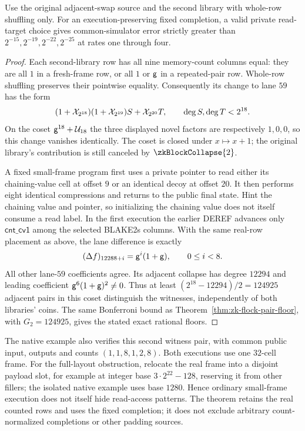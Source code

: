 \begin{theorem}\label{thm:zk-flock-shared-count-floor}
Use the original adjacent-swap source and the second library with whole-row shuffling only. For an execution-preserving fixed completion, a valid private read-target choice gives common-simulator error strictly greater than $2^{-15},2^{-19},2^{-22},2^{-25}$ at rates one through four.
\end{theorem}
\begin{proof}
Each second-library row has all nine memory-count columns equal: they are all $1$ in a fresh-frame row, or all $1$ or $\mathsf{g}$ in a repeated-pair row. Whole-row shuffling preserves their pointwise equality. Consequently its change to lane $59$ has the form
\[
 (1+\mathcal{X}_{2^{18}})(1+\mathcal{X}_{2^{19}})S
   +\mathcal{X}_{2^{20}}T,
 \qquad \deg S,\deg T<2^{18}.
\]
On the coset $\mathsf{g}^{18}+\mathcal{U}_{18}$ the three displayed novel factors are respectively $1,0,0$, so this change vanishes identically. The coset is closed under $x\mapsto x+1$; the original library's contribution is still canceled by $\zkBlockCollapse{2}$.

A fixed small-frame program first uses a private pointer to read either its chaining-value cell at offset $9$ or an identical decoy at offset $20$. It then performs eight identical compressions and returns to the public final state. Hint the chaining value and pointer, so initializing the chaining value does not itself consume a read label. In the first execution the earlier DEREF advances only $\mathsf{cnt\_cv1}$ among the selected BLAKE2s columns. With the same real-row placement as above, the lane difference is exactly
\[
 (\Delta f)_{12288+i}=\mathsf{g}^i(1+\mathsf{g}),\qquad 0\le i<8.
\]
All other lane-$59$ coefficients agree. Its adjacent collapse has degree $12294$ and leading coefficient $\mathsf{g}^6(1+\mathsf{g})^2\ne0$. Thus at least $(2^{18}-12294)/2=124925$ adjacent pairs in this coset distinguish the witnesses, independently of both libraries' coins. The same Bonferroni bound as Theorem~\ref{thm:zk-flock-pair-floor}, with $G_2=124925$, gives the stated exact rational floors.
\end{proof}

The native example also verifies this second witness pair, with common public input, outputs and counts $(1,1,8,1,2,8)$. Both executions use one $32$-cell frame. For the full-layout obstruction, relocate the real frame into a disjoint payload slot, for example at integer base $3\cdot2^{22}-128$, reserving it from other fillers; the isolated native example uses base $1280$. Hence ordinary small-frame execution does not itself hide read-access patterns. The theorem retains the real counted rows and uses the fixed completion; it does not exclude arbitrary count-normalized completions or other padding sources.

